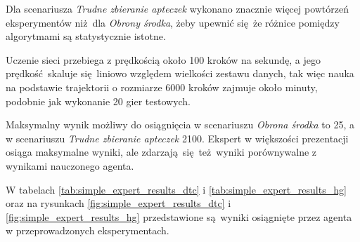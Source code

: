 Dla scenariusza \textit{Trudne zbieranie apteczek} wykonano znacznie więcej powtórzeń eksperymentów niż dla \textit{Obrony środka}, żeby upewnić się że różnice pomiędzy algorytmami są statystycznie istotne.

Uczenie sieci przebiega z prędkością około 100 kroków na sekundę, a jego prędkość skaluje się liniowo względem wielkości zestawu danych, tak więc nauka na podstawie trajektorii o rozmiarze 6000 kroków zajmuje około minuty, podobnie jak wykonanie 20 gier testowych.

Maksymalny wynik możliwy do osiągnięcia w scenariuszu \textit{Obrona środka} to 25, a w scenariuszu \textit{Trudne zbieranie apteczek} 2100. Ekspert w większości prezentacji osiąga maksymalne wyniki, ale zdarzają się też wyniki porównywalne z wynikami nauczonego agenta.

W tabelach \ref{tab:simple_expert_results_dtc} i \ref{tab:simple_expert_results_hg} oraz na rysunkach \ref{fig:simple_expert_results_dtc} i \ref{fig:simple_expert_results_hg} przedstawione są wyniki osiągnięte przez agenta w przeprowadzonych eksperymentach.

\begin{figure}[H]
\end{figure}

